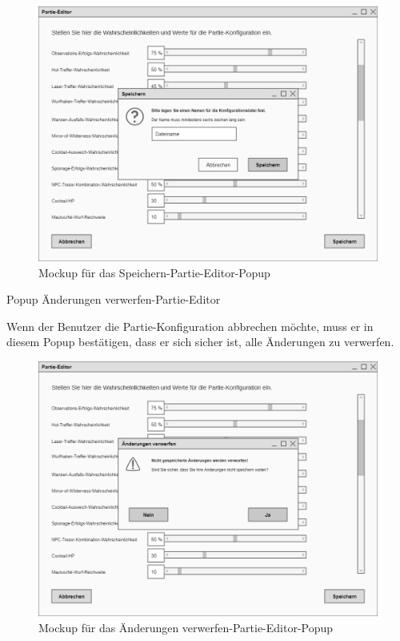 \begin{figure}[H]
  \centering
  \includegraphics[width=\textwidth]{Meilenstein03/Speichern-Partie-Editor_Mockup.png}
  \caption{Mockup für das Speichern-Partie-Editor-Popup}
\end{figure}

Popup \glqq{}Änderungen verwerfen-Partie-Editor\grqq{}

Wenn der Benutzer die Partie-Konfiguration abbrechen möchte, muss er in diesem Popup bestätigen, dass er sich sicher ist, alle Änderungen zu verwerfen.

\begin{figure}[H]
  \centering
  \includegraphics[width=\textwidth]{Meilenstein03/AenderungenVerwerfen-Partie-Editor_Mockup.png}
  \caption{Mockup für das Änderungen verwerfen-Partie-Editor-Popup}
\end{figure}

